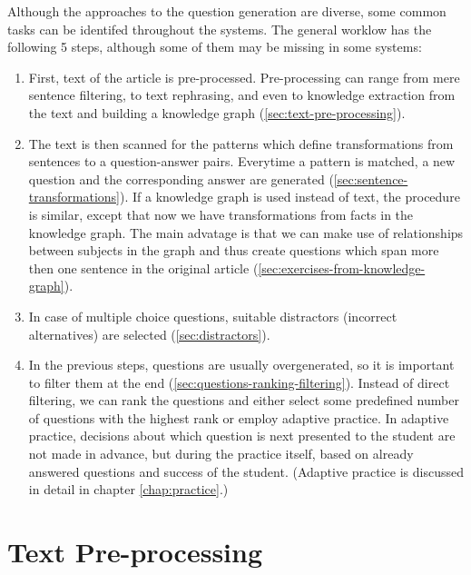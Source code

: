 \documentclass[a4paper, 12pt, twoside]{fithesis2}		%
\renewcommand{\_}{\leavevmode \kern0.07em\vbox{\hrule width0.4em}}
\newenvironment{myEnumerate}{
  \begin{enumerate}[leftmargin=2em,rightmargin=1em,itemsep=\parskip ,parsep=0em,topsep=0em,partopsep=0em]
}{
  \end{enumerate}
}
\newcounter{choice}
\begin{document}
Although the approaches to the question generation are diverse,
some common tasks can be identifed throughout the systems.
The general worklow has the following 5 steps, although some of them may be missing in some systems:
\begin{myEnumerate}
\item First, text of the article is pre-processed.
Pre-processing can range from mere sentence filtering,
to text rephrasing, and even to knowledge extraction from the text and building a knowledge graph
(\autoref{sec:text-pre-processing}).

\item The text is then scanned for the patterns which define transformations from sentences to a question-answer pairs.
  Everytime a pattern is matched, a new question and the corresponding answer are generated
  (\autoref{sec:sentence-transformations}).
  If a knowledge graph is used instead of text, the procedure is similar, except that now we have transformations from facts in the knowledge graph. The main advatage is that we can make use of relationships between subjects in the graph and thus create questions which span more then one sentence in the original article
  (\autoref{sec:exercises-from-knowledge-graph}).

\item In case of multiple choice questions, suitable distractors (incorrect alternatives) are selected
(\autoref{sec:distractors}).

\item In the previous steps, questions are usually overgenerated, so it is important to filter them at the end
  (\autoref{sec:questions-ranking-filtering}).
  Instead of direct filtering, we can rank the questions and either select some predefined number of questions with the highest rank
  or employ adaptive practice.
In adaptive practice, decisions about which question is next presented to the student
are not made in advance, but during the practice itself,
based on already answered questions and success of the student.
(Adaptive practice is discussed in detail in chapter \autoref{chap:practice}.)
\end{myEnumerate}

\section{Text Pre-processing}
\label{sec:text-pre-processing}
\end{document}
